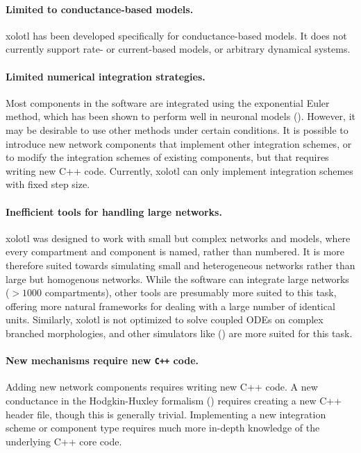 \documentclass{frontiersSCNS} %
\begin{document}
\paragraph{Limited to conductance-based models.} xolotl has been developed specifically for conductance-based models. It does not currently support rate- or current-based models, or arbitrary dynamical systems.

\paragraph{Limited numerical integration strategies.} Most components in the software are integrated using the exponential Euler method, which has been shown to perform well in neuronal models (\cite{ohErrorAnalysisSpecialized2006, dayanTheoreticalNeuroscience2001}). However, it may be desirable to use other methods under certain conditions. It is possible to introduce new network components that implement other integration schemes, or to modify the integration schemes of existing components, but that requires writing new C++  code. Currently, xolotl can only implement integration schemes with fixed step size.

\paragraph{Inefficient tools for handling large networks.} xolotl was designed to work with small but complex networks and models, where every compartment and component is named, rather than numbered. It is more therefore suited towards simulating small and heterogeneous networks rather than large but homogenous networks. While the software can integrate large networks ($>1000$ compartments), other tools are presumably more suited to this task, offering more natural frameworks for dealing with a large number of identical units. Similarly, xolotl is not optimized to solve coupled ODEs on complex branched morphologies, and other simulators like (\cite{hinesNEURONSimulationEnvironment1997}) are more suited for this task. 

\paragraph{New mechanisms require new \texttt{C++} code.} Adding new network components requires writing new C++ code. A new conductance in the Hodgkin-Huxley formalism (\cite{hodgkinComponentsMembraneConductance1952, hodgkinMeasurementCurrentvoltageRelations1952, hodgkinQuantitativeDescriptionMembrane1952, dayanTheoreticalNeuroscience2001}) requires creating a new C++ header file, though this is generally trivial. Implementing a new integration scheme or component type requires much more in-depth knowledge of the underlying C++ core code.
\end{document}
